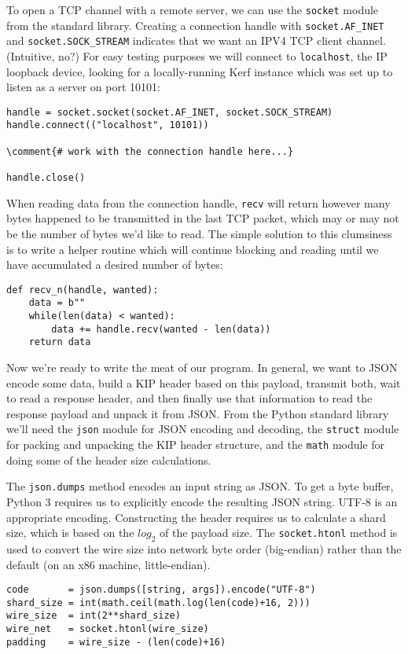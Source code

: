 \documentclass{article}
\newcommand{\comment}[1]{\textcolor{Orange}{#1}}
\begin{document}
To open a TCP channel with a remote server, we can use the \texttt{socket} module from the standard library. Creating a connection handle with \texttt{socket.AF\_INET} and \texttt{socket.SOCK\_STREAM} indicates that we want an IPV4 TCP client channel. (Intuitive, no?) For easy testing purposes we will connect to \texttt{localhost}, the IP loopback device, looking for a locally-running Kerf instance which was set up to listen as a server on port 10101:
\begin{Verbatim}
handle = socket.socket(socket.AF_INET, socket.SOCK_STREAM)
handle.connect(("localhost", 10101))

\comment{# work with the connection handle here...}

handle.close()
\end{Verbatim}

When reading data from the connection handle, \texttt{recv} will return however many bytes happened to be transmitted in the last TCP packet, which may or may not be the number of bytes we'd like to read. The simple solution to this clumsiness is to write a helper routine which will continue blocking and reading until we have accumulated a desired number of bytes:

\begin{Verbatim}
def recv_n(handle, wanted):
	data = b""
	while(len(data) < wanted):
		data += handle.recv(wanted - len(data))
	return data
\end{Verbatim}

Now we're ready to write the meat of our program. In general, we want to JSON encode some data, build a KIP header based on this payload, transmit both, wait to read a response header, and then finally use that information to read the response payload and unpack it from JSON. From the Python standard library we'll need the \texttt{json} module for JSON encoding and decoding, the \texttt{struct} module for packing and unpacking the KIP header structure, and the \texttt{math} module for doing some of the header size calculations.

\pagebreak
The \texttt{json.dumps} method encodes an input string as JSON. To get a byte buffer, Python 3 requires us to explicitly encode the resulting JSON string. UTF-8 is an appropriate encoding. Constructing the header requires us to calculate a shard size, which is based on the $log_{2}$ of the payload size. The \texttt{socket.htonl} method is used to convert the wire size into network byte order (big-endian) rather than the default (on an x86 machine, little-endian).
\begin{Verbatim}
code       = json.dumps([string, args]).encode("UTF-8")
shard_size = int(math.ceil(math.log(len(code)+16, 2)))
wire_size  = int(2**shard_size)
wire_net   = socket.htonl(wire_size)
padding    = wire_size - (len(code)+16)
\end{Verbatim}
\end{document}
